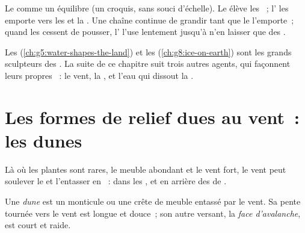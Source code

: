 \begin{omfigure}
{\small Le  comme un équilibre (un croquis, sans souci d'échelle). Le
 élève les ~; l' les emporte vers les  et la
. Une chaîne continue de grandir tant que le  l'emporte~;
quand les  cessent de pousser, l' l'use lentement jusqu'à
n'en laisser que des .}
\label{fig:g9:landforms:balance}
\end{omfigure}

Les  (\cref{ch:g5:water-shapes-the-land}) et les 
(\cref{ch:g8:ice-on-earth}) sont les grands sculpteurs des . La
suite de ce chapitre suit trois autres agents, qui façonnent leurs propres
~: le vent, la , et l'eau qui dissout la .

\section{Les formes de relief dues au vent~: les dunes}

Là où les plantes sont rares, le  meuble abondant et le vent fort, le
vent peut soulever le  et l'entasser en ~: dans les ,
et en arrière des  de .

\begin{definition}[Dune]\label{def:g9:landforms:dune}
Une \emph{dune} est un monticule ou une crête de  meuble
entassé par le vent. Sa pente tournée vers le vent est longue et douce~;
son autre versant, la \emph{face d'avalanche}, est
court et raide.
\end{definition}


